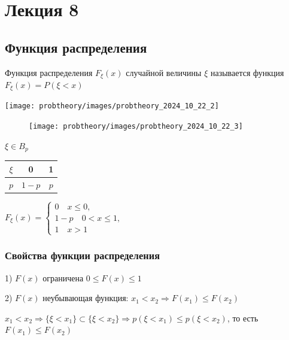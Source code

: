 \documentclass[12pt]{article}
\begin{document}
    \section{Лекция 8}

    \subsection{Функция распределения}

    \hypertarget{distributionfunction}{}

    \Def Функция распределения $F_\xi(x)$ случайной величины $\xi$ называется функция $F_\xi(x) = P(\xi < x)$

    \texttt{[image: probtheory/images/probtheory\_2024\_10\_22\_2]}

    \begin{minipage}{\textwidth}
        \begin{figure}
            \texttt{[image: probtheory/images/probtheory\_2024\_10\_22\_3]}
        \end{figure}

        \Ex $\xi \in B_p$ \qquad \begin{tabular}{c|c|c}
            $\xi$ & 0 & 1 \\ \hline
            $p$ & $1 - p$ & $p$ \\
        \end{tabular}
        
        $F_\xi(x) = \begin{cases}0 \quad x \leq 0, \\ 1 - p \quad 0 < x \leq 1, \\ 1 \quad x > 1\end{cases}$

    \end{minipage}

    \hypertarget{distributionfunctionproperties}{}

    \subsubsection{Свойства функции распределения}

    1) $F(x)$ ограничена $0 \leq F(x) \leq 1$

    2) $F(x)$ неубывающая функция: $x_1 < x_2 \Longrightarrow F(x_1) \leq F(x_2)$ 

    \begin{MyProof}
        $x_1 < x_2 \Longrightarrow \{\xi < x_1\} \subset \{\xi < x_2\} \Longrightarrow p(\xi < x_1) \leq p(\xi < x_2)$, то есть $F(x_1) \leq F(x_2)$
    \end{MyProof}
\end{document}
